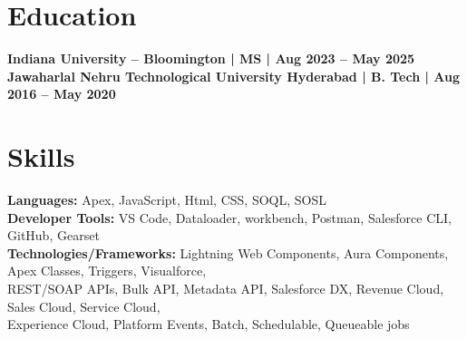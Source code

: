 \documentclass[a4paper,11pt]{article}
\begin{document}
\section*{Education}
\textbf{Indiana University – Bloomington | MS | Aug 2023 – May 2025}\\
\textbf{Jawaharlal Nehru Technological University Hyderabad | B. Tech | Aug 2016 – May 2020}

\section*{Skills}
\textbf{Languages:} Apex, JavaScript, Html, CSS, SOQL, SOSL \\
\textbf{Developer Tools:} VS Code, Dataloader, workbench, Postman, Salesforce CLI, GitHub, Gearset \\
\textbf{Technologies/Frameworks:} Lightning Web Components, Aura Components, Apex Classes, Triggers, Visualforce, \\
REST/SOAP APIs, Bulk API, Metadata API, Salesforce DX, Revenue Cloud, Sales Cloud, Service Cloud, \\
Experience Cloud, Platform Events, Batch, Schedulable, Queueable jobs
\end{document}

